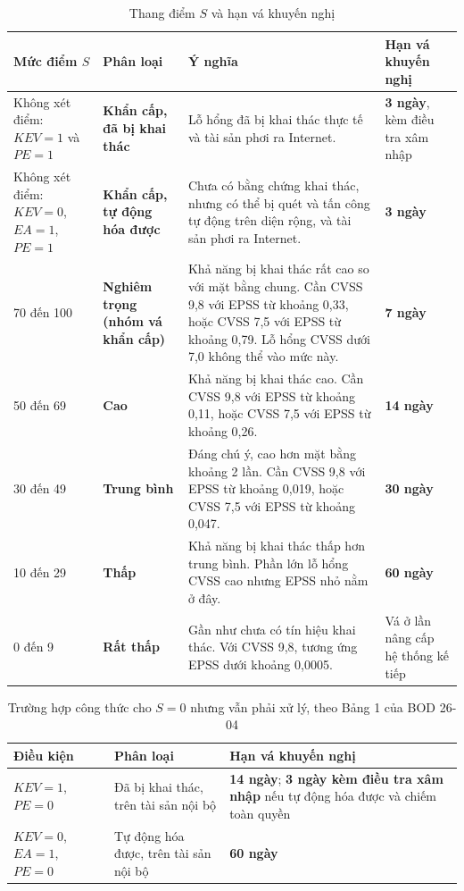 \documentclass[conference]{IEEEtran}
\begin{document}
\begin{table}[t]
\centering
\caption{Thang điểm $S$ và hạn vá khuyến nghị}\label{tab:thangdiem}
\small
\begin{tabular}{L{3.0cm}L{3.0cm}L{7.6cm}L{2.6cm}}
\toprule
Mức điểm $S$ & Phân loại & Ý nghĩa & Hạn vá khuyến nghị \\
\midrule
Không xét điểm: $\mathit{KEV} = 1$ và $\mathit{PE} = 1$ & \textbf{Khẩn cấp, đã bị khai thác} & Lỗ hổng đã bị khai thác thực tế và tài sản phơi ra Internet. & \textbf{3 ngày}, kèm điều tra xâm nhập \\
Không xét điểm: $\mathit{KEV} = 0$, $\mathit{EA} = 1$, $\mathit{PE} = 1$ & \textbf{Khẩn cấp, tự động hóa được} & Chưa có bằng chứng khai thác, nhưng có thể bị quét và tấn công tự động trên diện rộng, và tài sản phơi ra Internet. & \textbf{3 ngày} \\
70 đến 100 & \textbf{Nghiêm trọng (nhóm vá khẩn cấp)} & Khả năng bị khai thác rất cao so với mặt bằng chung. Cần CVSS 9,8 với EPSS từ khoảng 0,33, hoặc CVSS 7,5 với EPSS từ khoảng 0,79. Lỗ hổng CVSS dưới 7,0 không thể vào mức này. & \textbf{7 ngày} \\
50 đến 69 & \textbf{Cao} & Khả năng bị khai thác cao. Cần CVSS 9,8 với EPSS từ khoảng 0,11, hoặc CVSS 7,5 với EPSS từ khoảng 0,26. & \textbf{14 ngày} \\
30 đến 49 & \textbf{Trung bình} & Đáng chú ý, cao hơn mặt bằng khoảng 2 lần. Cần CVSS 9,8 với EPSS từ khoảng 0,019, hoặc CVSS 7,5 với EPSS từ khoảng 0,047. & \textbf{30 ngày} \\
10 đến 29 & \textbf{Thấp} & Khả năng bị khai thác thấp hơn trung bình. Phần lớn lỗ hổng CVSS cao nhưng EPSS nhỏ nằm ở đây. & \textbf{60 ngày} \\
0 đến 9 & \textbf{Rất thấp} & Gần như chưa có tín hiệu khai thác. Với CVSS 9,8, tương ứng EPSS dưới khoảng 0,0005. & Vá ở lần nâng cấp hệ thống kế tiếp \\
\bottomrule
\end{tabular}
\end{table}

\begin{table}[t]
\centering
\caption{Trường hợp công thức cho $S = 0$ nhưng vẫn phải xử lý, theo Bảng 1 của BOD 26-04}\label{tab:s0}
\small
\begin{tabular}{L{3.6cm}L{4.6cm}L{8.0cm}}
\toprule
Điều kiện & Phân loại & Hạn vá khuyến nghị \\
\midrule
$\mathit{KEV} = 1$, $\mathit{PE} = 0$ & Đã bị khai thác, trên tài sản nội bộ & \textbf{14 ngày}; \textbf{3 ngày kèm điều tra xâm nhập} nếu tự động hóa được và chiếm toàn quyền \\
$\mathit{KEV} = 0$, $\mathit{EA} = 1$, $\mathit{PE} = 0$ & Tự động hóa được, trên tài sản nội bộ & \textbf{60 ngày} \\
\bottomrule
\end{tabular}
\end{table}
\end{document}

